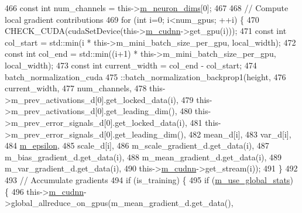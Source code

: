 \begin{DoxyCode}
466     \textcolor{keyword}{const} \textcolor{keywordtype}{int} num\_channels = this->\hyperlink{classlbann_1_1Layer_abb34bb8031f57a483e2e327a5f229f48}{m\_neuron\_dims}[0];
467 
468     \textcolor{comment}{// Compute local gradient contributions}
469     \textcolor{keywordflow}{for} (\textcolor{keywordtype}{int} i=0; i<num\_gpus; ++i) \{
470       CHECK\_CUDA(cudaSetDevice(this->\hyperlink{classlbann_1_1Layer_a08dbb94239e3b8c96329786c57c72e21}{m\_cudnn}->get\_gpu(i)));
471       \textcolor{keyword}{const} \textcolor{keywordtype}{int} col\_start = std::min(i * this->m\_mini\_batch\_size\_per\_gpu, local\_width);
472       \textcolor{keyword}{const} \textcolor{keywordtype}{int} col\_end = std::min((i+1) * this->m\_mini\_batch\_size\_per\_gpu, local\_width);
473       \textcolor{keyword}{const} \textcolor{keywordtype}{int} current\_width = col\_end - col\_start;
474       batch\_normalization\_cuda
475         ::batch\_normalization\_backprop1(height,
476                                         current\_width,
477                                         num\_channels,
478                                         this->m\_prev\_activations\_d[0].get\_locked\_data(i),
479                                         this->m\_prev\_activations\_d[0].get\_leading\_dim(),
480                                         this->m\_prev\_error\_signals\_d[0].get\_locked\_data(i),
481                                         this->m\_prev\_error\_signals\_d[0].get\_leading\_dim(),
482                                         mean\_d[i],
483                                         var\_d[i],
484                                         \hyperlink{classlbann_1_1batch__normalization_ab82e74f905b7a117d9940f8542451e37}{m\_epsilon},
485                                         scale\_d[i],
486                                         m\_scale\_gradient\_d.get\_data(i),
487                                         m\_bias\_gradient\_d.get\_data(i),
488                                         m\_mean\_gradient\_d.get\_data(i),
489                                         m\_var\_gradient\_d.get\_data(i),
490                                         this->\hyperlink{classlbann_1_1Layer_a08dbb94239e3b8c96329786c57c72e21}{m\_cudnn}->get\_stream(i));
491     \}
492 
493     \textcolor{comment}{// Accumulate gradients}
494     \textcolor{keywordflow}{if} (is\_training) \{
495       \textcolor{keywordflow}{if} (\hyperlink{classlbann_1_1batch__normalization_a0a33289150c01899f4b7ef2980771899}{m\_use\_global\_stats}) \{
496         this->\hyperlink{classlbann_1_1Layer_a08dbb94239e3b8c96329786c57c72e21}{m\_cudnn}->global\_allreduce\_on\_gpus(m\_mean\_gradient\_d.get\_data(),

\end{DoxyCode}
